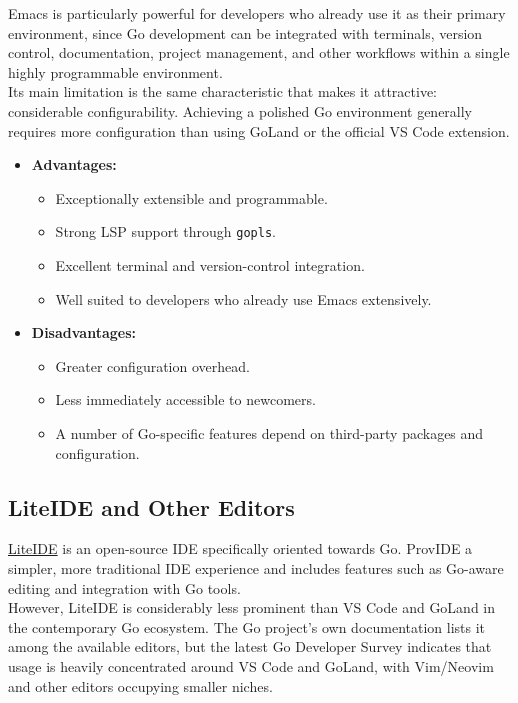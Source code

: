 Emacs is particularly powerful for developers who already use it as their primary environment, since Go development can be integrated with terminals, version control, documentation, project management, and other workflows within a single highly programmable environment.\\

Its main limitation is the same characteristic that makes it attractive: considerable configurability. Achieving a polished Go environment generally requires more configuration than using GoLand or the official VS Code extension.

\begin{itemize}
\item \textbf{Advantages:}
\begin{itemize}
\item Exceptionally extensible and programmable.
\item Strong LSP support through \texttt{gopls}.
\item Excellent terminal and version-control integration.
\item Well suited to developers who already use Emacs extensively.
\end{itemize}

\item \textbf{Disadvantages:}
\begin{itemize}
    \item Greater configuration overhead.
    \item Less immediately accessible to newcomers.
    \item A number of Go-specific features depend on third-party packages and configuration.
\end{itemize}

\end{itemize}

\subsection{LiteIDE and Other Editors}

\href{https://github.com/visualfc/liteide}{LiteIDE} is an open-source IDE specifically oriented towards Go. ProvIDE a simpler, more traditional IDE experience and includes features such as Go-aware editing and integration with Go tools.\\

However, LiteIDE is considerably less prominent than VS Code and GoLand in the contemporary Go ecosystem. The Go project's own documentation lists it among the available editors, but the latest Go Developer Survey indicates that usage is heavily concentrated around VS Code and GoLand, with Vim/Neovim and other editors occupying smaller niches.\\

